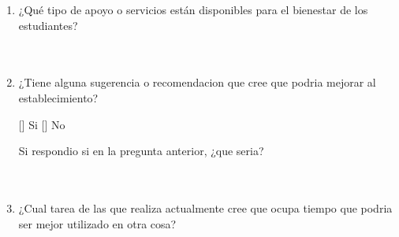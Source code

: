 \documentclass{article}
\begin{document}
\begin{enumerate}[leftmargin=*, label=\arabic*.]
    \item ¿Qué tipo de apoyo o servicios están disponibles para el bienestar de los estudiantes? \\[0.5cm]
        \underline{\hspace{0.95\linewidth}} \vspace{0.3cm} \\
        \underline{\hspace{0.95\linewidth}} \vspace{0.3cm} \\
        \underline{\hspace{0.95\linewidth}} \vspace{0.3cm}
    \item ¿Tiene alguna sugerencia o recomendacion que cree que podria mejorar al establecimiento?
    \begin{center}
        [\hspace*{0.25cm}] Si \hspace{1cm} [\hspace*{0.25cm}] No
    \end{center}
    Si respondio si en la pregunta anterior, ¿que seria? \\[0.5cm]
        \underline{\hspace{0.95\linewidth}} \vspace{0.3cm} \\
        \underline{\hspace{0.95\linewidth}} \vspace{0.3cm} \\
        \underline{\hspace{0.95\linewidth}} \vspace{0.3cm}
        \item ¿Cual tarea de las que realiza actualmente cree que ocupa tiempo que podria ser mejor utilizado en otra cosa?\\[0.5cm]
        \underline{\hspace{0.95\linewidth}} \vspace{0.3cm} \\
        \underline{\hspace{0.95\linewidth}} \vspace{0.3cm} \\

\end{enumerate}
\end{document}
